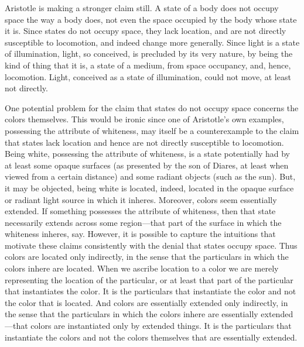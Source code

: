 
Aristotle is making a stronger claim still. A state of a body does not occupy space the way a body does, not even the space occupied by the body whose state it is. Since states do not occupy space, they lack location, and are not directly susceptible to locomotion, and indeed change more generally. Since light is a state of illumination, light, so conceived, is precluded by its very nature, by being the kind of thing that it is, a state of a medium, from space occupancy, and, hence, locomotion. Light, conceived as a state of illumination, could not move, at least not directly.

One potential problem for the claim that states do not occupy space concerns the colors themselves. This would be ironic since one of Aristotle's own examples, possessing the attribute of whiteness, may itself be a counterexample to the claim that states lack location and hence are not directly susceptible to locomotion. Being white, possessing the attribute of whiteness, is a state potentially had by at least some opaque surfaces (as presented by the son of Diares, at least when viewed from a certain distance) and some radiant objects (such as the sun). But, it may be objected, being white is located, indeed, located in the opaque surface or radiant light source in which it inheres. Moreover, colors seem essentially extended. If something possesses the attribute of whiteness, then that state necessarily extends across some region---that part of the surface in which the whiteness inheres, say. However, it is possible to capture the intuitions that motivate these claims consistently with the denial that states occupy space. Thus colors are located only indirectly, in the sense that the particulars in which the colors inhere are located. When we ascribe location to a color we are merely representing the location of the particular, or at least that part of the particular that instantiates the color. It is the particulars that instantiate the color and not the color that is located. And colors are essentially extended only indirectly, in the sense that the particulars in which the colors inhere are essentially extended---that colors are instantiated only by extended things. It is the particulars that instantiate the colors and not the colors themselves that are essentially extended.

